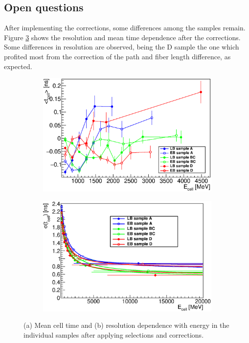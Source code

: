 \subsection{Open questions}
\label{sec:pileup}
After implementing the corrections, some differences among the samples remain.
Figure \ref{fig:final_split} shows the resolution and mean time dependence after the corrections.
Some differences in resolution are observed, being the D sample the one which profited most from the correction of the path and fiber length difference, as expected.

\begin{figure}[tb!]
  \begin{center}
    \begin{subfigure}{0.49\textwidth}
    \includegraphics[width=\textwidth]{TileTimingPerformance/Figures/final_split_mean.eps}
      \caption{}
      \label{fig:final_split_mean}
    \end{subfigure}
    \begin{subfigure}{0.49\textwidth}
      \includegraphics[width=\textwidth]{TileTimingPerformance/Figures/final_split_res.eps}
      \caption{}
      \label{fig:final_split_res}
    \end{subfigure}
  \end{center}
  \caption{(a) Mean cell time and (b) resolution dependence with energy in the individual samples after applying selections and corrections.}
  \label{fig:final_split}
\end{figure}


